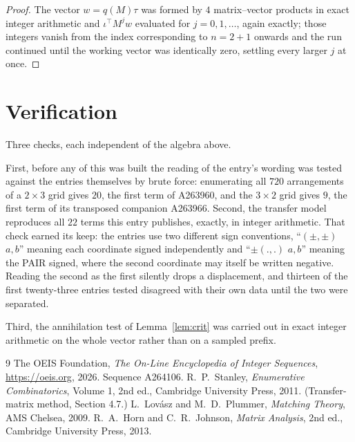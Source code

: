 \documentclass[11pt,a4paper]{article}
\theoremstyle{plain}
\theoremstyle{definition}
\begin{document}
\begin{proof}
The vector $w=q(M)\tau$ was formed by $4$ matrix--vector products in exact integer
arithmetic and $\iota^{\!\top}M^{j}w$ evaluated for $j=0,1,\dots$, again exactly; those
integers vanish from the index corresponding to $n=2+1$ onwards and the run continued
until the working vector was identically zero, settling every larger $j$ at once.
\end{proof}

\section{Verification}

Three checks, each independent of the algebra above.

First, before any of this was built the reading of the entry's wording was tested against the
entries themselves by brute force: enumerating all $720$ arrangements of a $2\times3$ grid
gives $20$, the first term of A263960, and the $3\times2$ grid gives $9$, the first term of its
transposed companion A263966. Second, the transfer model reproduces all $22$ terms this
entry publishes, exactly, in integer arithmetic. That check earned its keep: the entries use
two different sign conventions, ``$(\pm,\pm)$ $a,b$'' meaning each coordinate signed
independently and ``$\pm(.,.)$ $a,b$'' meaning the PAIR signed, where the second coordinate may
itself be written negative. Reading the second as the first silently drops a displacement, and
thirteen of the first twenty-three entries tested disagreed with their own data until the two
were separated.

Third, the annihilation test of Lemma~\ref{lem:crit} was carried out in exact integer
arithmetic on the whole vector rather than on a sampled prefix.

\begin{thebibliography}{9}
 The OEIS Foundation, \emph{The On-Line Encyclopedia of Integer
Sequences}, \url{https://oeis.org}, 2026. Sequence A264106.
 R.~P.~Stanley, \emph{Enumerative Combinatorics}, Volume 1, 2nd ed.,
Cambridge University Press, 2011. (Transfer-matrix method, Section 4.7.)
 L.~Lov\'asz and M.~D.~Plummer, \emph{Matching Theory}, AMS Chelsea, 2009.
 R.~A.~Horn and C.~R.~Johnson, \emph{Matrix Analysis}, 2nd ed., Cambridge
University Press, 2013.
\end{thebibliography}
\end{document}
